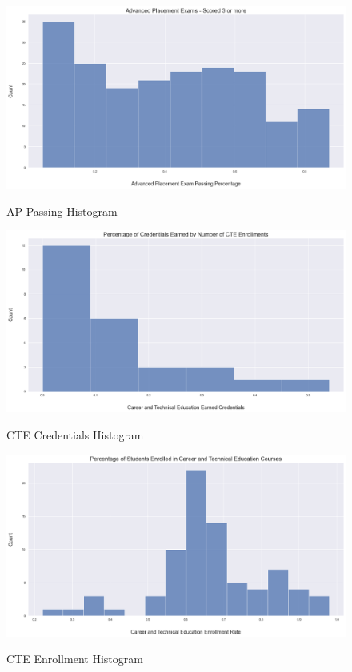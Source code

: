 \documentclass[stu, 12pt, floatsintext]{apa7}
\begin{document}
\begin{figure}
    \caption{AP Passing Histogram}
    \includegraphics[width=17cm]{AP_pass_pct_histogram.png}
    \label{fig6}
\end{figure}

\begin{figure}
    \caption{CTE Credentials Histogram}
    \includegraphics[width=17cm]{CTE_cred_pct_histogram.png}
    \label{fig7}
\end{figure}

\begin{figure}
    \caption{CTE Enrollment Histogram}
    \includegraphics[width=17cm]{CTE_enroll_pct_histogram.png}
    \label{fig8}
\end{figure}
\end{document}
